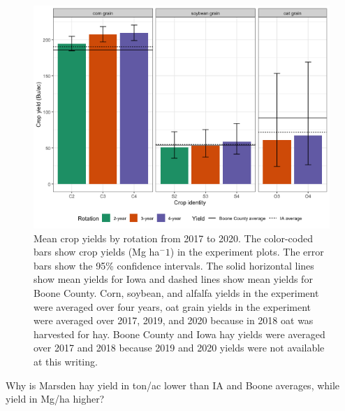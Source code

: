 \documentclass[
]{article}
\begin{document}
\begin{figure}
\centering
\includegraphics{Crop_yields_bushel_files/figure-latex/crop-bar-1.png}
\caption{\label{fig:crop-bar}Mean crop yields by rotation from 2017 to 2020. The color-coded bars show crop yields (Mg ha\(^-1\)) in the experiment plots. The error bars show the 95\% confidence intervals. The solid horizontal lines show mean yields for Iowa and dashed lines show mean yields for Boone County. Corn, soybean, and alfalfa yields in the experiment were averaged over four years, oat grain yields in the experiment were averaged over 2017, 2019, and 2020 because in 2018 oat was harvested for hay. Boone County and Iowa hay yields were averaged over 2017 and 2018 because 2019 and 2020 yields were not available at this writing.}
\end{figure}

Why is Marsden hay yield in ton/ac lower than IA and Boone averages, while yield in Mg/ha higher?
\end{document}
